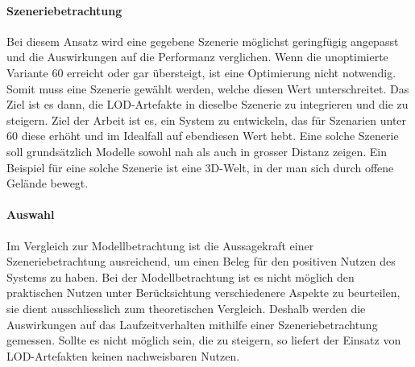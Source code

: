 \paragraph{Szeneriebetrachtung}
Bei diesem Ansatz wird eine gegebene Szenerie möglichst geringfügig angepasst und die Auswirkungen auf die Performanz verglichen.
Wenn die unoptimierte Variante 60  erreicht oder gar übersteigt, ist eine Optimierung nicht notwendig. Somit muss eine Szenerie gewählt werden, welche diesen Wert unterschreitet.
Das Ziel ist es dann, die LOD-Artefakte in dieselbe Szenerie zu integrieren und die  zu steigern. Ziel der Arbeit ist es, ein System zu entwickeln, das für Szenarien unter 60  diese erhöht und im Idealfall auf ebendiesen Wert hebt.
Eine solche Szenerie soll grundsätzlich Modelle sowohl nah als auch in grosser Distanz zeigen. Ein Beispiel für eine solche Szenerie ist eine 3D-Welt, in der man sich durch offene Gelände bewegt.

\paragraph{Auswahl}
Im Vergleich zur Modellbetrachtung ist die Aussagekraft einer Szeneriebetrachtung ausreichend, um einen Beleg für den positiven Nutzen des Systems zu haben. Bei der Modellbetrachtung ist es nicht möglich den praktischen Nutzen unter Berücksichtung verschiedenere Aspekte zu beurteilen, sie dient ausschliesslich zum theoretischen Vergleich. Deshalb werden die Auswirkungen auf das Laufzeitverhalten mithilfe einer Szeneriebetrachtung gemessen. Sollte es nicht möglich sein, die  zu steigern, so liefert der Einsatz von LOD-Artefakten keinen nachweisbaren Nutzen.
